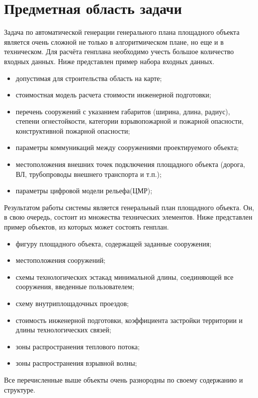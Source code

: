 \section{\Large{Предметная область задачи}}

Задача по автоматической генерации генерального плана площадного объекта является очень сложной не только
в алгоритмическом плане, но еще и в техническом. Для расчёта генплана необходимо учесть большое количество входных
данных.
Ниже представлен пример набора входных данных.
\begin{itemize}
    \item допустимая для строительства область на карте;
    \item стоимостная модель расчета стоимости инженерной подготовки;
    \item перечень сооружений с указанием габаритов (ширина, длина, радиус),
    степени огнестойкости, категории взрывопожарной и пожарной опасности, конструктивной пожарной опасности;
    \item параметры коммуникаций между сооружениями проектируемого объекта;
    \item местоположения внешних точек подключения площадного объекта (дорога, ВЛ, трубопроводы внешнего транспорта и т.п.);
    \item параметры цифровой модели рельефа(ЦМР);
\end{itemize}

Результатом работы системы является генеральный план площадного объекта.
Он, в свою очередь, состоит из множества технических элементов.
Ниже представлен пример объектов, из которых может состоять генплан.
\begin{itemize}
    \item фигуру площадного объекта, содержащей заданные сооружения;
    \item местоположения сооружений;
    \item схемы технологических эстакад минимальной длины, соединяющей все сооружения, введенные пользователем;
    \item схему внутриплощадочных проездов;
    \item стоимость инженерной подготовки, коэффициента застройки территории и длины технологических связей;
    \item зоны распространения теплового потока;
    \item зоны распространения взрывной волны;
\end{itemize}

Все перечисленные выше объекты очень разнородны по своему содержанию и структуре.